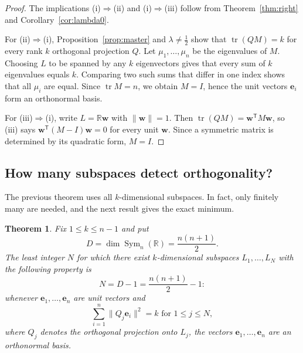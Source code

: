 \documentclass[11pt]{article}
\newtheorem{theorem}{Theorem}[section]
\theoremstyle{definition}
\theoremstyle{remark}
\DeclareMathOperator{\tr}{tr}
\newcommand{\T}{\mathsf{T}}
\newcommand{\R}{\mathbb{R}}
\newcommand{\be}{\mathbf e}
\newcommand{\bw}{\mathbf w}
\newcommand{\norm}[1]{\lVert #1 \rVert}
\begin{document}
\begin{proof}
The implications (i)$\Rightarrow$(ii) and (i)$\Rightarrow$(iii) follow from
Theorem~\ref{thm:right} and Corollary~\ref{cor:lambda0}.

For (ii)$\Rightarrow$(i), Proposition~\ref{prop:master} and
$\lambda\ne\tfrac12$ show that $\tr(QM)=k$ for every rank $k$ orthogonal projection $Q$.
Let $\mu_1,\ldots,\mu_n$ be the eigenvalues of $M$. Choosing $L$ to be spanned by any
$k$ eigenvectors gives that every sum of $k$ eigenvalues equals $k$. Comparing two such
sums that differ in one index shows that all $\mu_i$ are equal. Since $\tr M=n$, we obtain
$M=I$, hence the unit vectors $\be_i$ form an orthonormal basis.

For (iii)$\Rightarrow$(i), write $L=\R\bw$ with $\norm\bw=1$. Then
$\tr(QM)=\bw^{\T}M\bw$, so (iii) says $\bw^{\T}(M-I)\bw=0$ for every unit $\bw$. Since a
symmetric matrix is determined by its quadratic form, $M=I$.
\end{proof}

\subsection{How many subspaces detect orthogonality?}

The previous theorem uses all $k$-dimensional subspaces. In fact, only finitely many are needed, and the next result gives the exact minimum.

\begin{theorem}\label{prop:howmany}
Fix $1\le k\le n-1$ and put
\[
D=\dim\operatorname{Sym}_n(\R)=\frac{n(n+1)}2.
\]
The least integer $N$ for which there exist $k$-dimensional subspaces
$L_1,\ldots,L_N$ with the following property is
\[
N=D-1=\frac{n(n+1)}2-1:
\]
whenever $\be_1,\ldots,\be_n$ are unit vectors and
\[
\sum_{i=1}^{n}\norm{Q_j\be_i}^2=k \text{ for } 1\le j\le N,
\]
where $Q_j$ denotes the orthogonal projection onto $L_j$, the vectors
$\be_1,\ldots,\be_n$ are an orthonormal basis.
\end{theorem}
\end{document}
